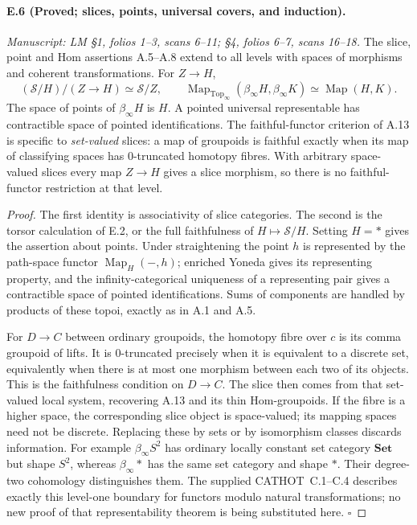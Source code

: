 \paragraph{E.6 (Proved; slices, points, universal covers, and induction).}
\textit{Manuscript: LM \S1, folios 1--3, scans 6--11; \S4, folios 6--7, scans 16--18.}
The slice, point and Hom assertions A.5--A.8 extend to all levels with spaces of morphisms and coherent transformations. For $Z\to H$,
\[
 (\mathcal S/H)/(Z\to H)\simeq\mathcal S/Z,
 \qquad
 \operatorname{Map}_{\mathrm{Top}_\infty}(\beta_\infty H,\beta_\infty K)
                         \simeq\operatorname{Map}(H,K).
                                                        \tag{E.6.1}
\]
The space of points of $\beta_\infty H$ is $H$. A pointed universal representable has contractible space of pointed identifications. The faithful-functor criterion of A.13 is specific to \emph{set-valued} slices: a map of groupoids is faithful exactly when its map of classifying spaces has $0$-truncated homotopy fibres. With arbitrary space-valued slices every map $Z\to H$ gives a slice morphism, so there is no faithful-functor restriction at that level.
\begin{proof}
The first identity is associativity of slice categories. The second is the torsor calculation of E.2, or the full faithfulness of $H\mapsto\mathcal S/H$. Setting $H=*$ gives the assertion about points. Under straightening the point $h$ is represented by the path-space functor $\operatorname{Map}_H(-,h)$; enriched Yoneda gives its representing property, and the infinity-categorical uniqueness of a representing pair gives a contractible space of pointed identifications. Sums of components are handled by products of these topoi, exactly as in A.1 and A.5.

For $D\to C$ between ordinary groupoids, the homotopy fibre over $c$ is its comma groupoid of lifts. It is $0$-truncated precisely when it is equivalent to a discrete set, equivalently when there is at most one morphism between each two of its objects. This is the faithfulness condition on $D\to C$. The slice then comes from that set-valued local system, recovering A.13 and its thin Hom-groupoids. If the fibre is a higher space, the corresponding slice object is space-valued; its mapping spaces need not be discrete. Replacing these by sets or by isomorphism classes discards information. For example $\beta_\infty S^2$ has ordinary locally constant set category $\mathbf{Set}$ but shape $S^2$, whereas $\beta_\infty *$ has the same set category and shape $*$. Their degree-two cohomology distinguishes them. The supplied CATHOT~C.1--C.4 describes exactly this level-one boundary for functors modulo natural transformations; no new proof of that representability theorem is being substituted here. \hfill$\square$
\end{proof}

